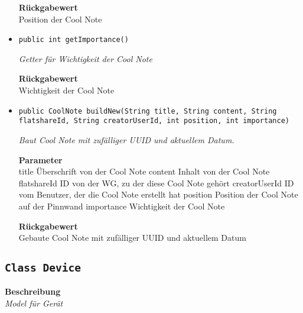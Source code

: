 \begin{itemize}
    	
    	
    	\textbf{Rückgabewert} \\
    	Position der Cool Note        \item{\texttt{public int getImportance()}}
    	
    	\textit{Getter für Wichtigkeit der Cool Note}
    	
    	
    	
    	\textbf{Rückgabewert} \\
    	Wichtigkeit der Cool Note        \item{\texttt{public CoolNote buildNew(String title, String content, String flatshareId, String creatorUserId, int position, int importance)}}
    	
    	\textit{Baut Cool Note mit zufälliger UUID und aktuellem Datum.}
    	
    	\textbf{Parameter} \\
    	title Überschrift von der Cool Note
    	content Inhalt von der Cool Note
    	flatshareId ID von der WG, zu der diese Cool Note gehört
    	creatorUserId ID vom Benutzer, der die Cool Note erstellt hat
    	position Position der Cool Note auf der Pinnwand
    	importance Wichtigkeit der Cool Note
    	
    	\textbf{Rückgabewert} \\
    	Gebaute Cool Note mit zufälliger UUID und aktuellem Datum
    \end{itemize}
    \subsection{\texttt{Class Device}}
    \textbf{Beschreibung} \\
    \textit{Model für Gerät}

